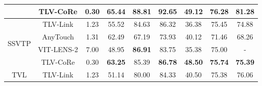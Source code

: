 \documentclass[letterpaper]{article} %
\theoremstyle{definition}                %
\theoremstyle{plain}                     %
\theoremstyle{remark}                    %
\begin{document}
\begin{table}[ht!]
\begin{tabular}{@{}c|c|c|ccc|c|c|
c@{}}
                               & TLV-CoRe   &     0.30        &      {\cellcolor[HTML]{F6E6E6}65.44}    &           {\cellcolor[HTML]{F6E6E6}\textbf{88.81}}   &   {\cellcolor[HTML]{F6E6E6}\textbf{92.65}}       &   {\cellcolor[HTML]{E2F0D9}\textbf{49.12}}                                &          {\cellcolor[HTML]{E2F0D9}\textbf{76.28}}        & \multicolumn{1}{c}{{\cellcolor[HTML]{E2F0D9}\textbf{81.28}}}                 \\ \midrule
\multirow{4}{*}{SSVTP}         & TLV-Link   &  1.23           &    {\cellcolor[HTML]{E2F0D9}55.52}      &        {\cellcolor[HTML]{E2F0D9}84.63}      &    {\cellcolor[HTML]{E2F0D9}86.32}      &      {\cellcolor[HTML]{E2F0D9}36.38}                             &         {\cellcolor[HTML]{E2F0D9}75.45}      & \multicolumn{1}{c}{{\cellcolor[HTML]{E2F0D9}74.88}}                    \\
                               & AnyTouch    & 1.31           &    {\cellcolor[HTML]{E2F0D9}62.49}      &     {\cellcolor[HTML]{E2F0D9}67.19}        &    {\cellcolor[HTML]{E2F0D9}73.93}       &          {\cellcolor[HTML]{E2F0D9}40.12}                         &  {\cellcolor[HTML]{E2F0D9}71.46}   & \multicolumn{1}{c}{{\cellcolor[HTML]{E2F0D9}68.26}}                              \\
                               & VIT-LENS-2   &  7.00         &     {\cellcolor[HTML]{E2F0D9}48.95}     &       {\cellcolor[HTML]{E2F0D9}\textbf{86.91}}       &    {\cellcolor[HTML]{E2F0D9}83.75}      &                         {\cellcolor[HTML]{E2F0D9}35.38}          &          {\cellcolor[HTML]{E2F0D9}75.00} & \multicolumn{1}{c}{{\cellcolor[HTML]{E2F0D9}-}}                         \\
                               & TLV-CoRe    &  0.30          &   {\cellcolor[HTML]{E2F0D9}\textbf{63.25}}       &    {\cellcolor[HTML]{E2F0D9}85.39}          &   {\cellcolor[HTML]{E2F0D9}\textbf{86.78}}       &     {\cellcolor[HTML]{E2F0D9}\textbf{48.50}}                              &    {\cellcolor[HTML]{E2F0D9}\textbf{75.74}}     & \multicolumn{1}{c}{{\cellcolor[HTML]{E2F0D9}\textbf{75.39}}}                          \\ \midrule
\multirow{4}{*}{TVL}           & TLV-Link    &  1.23         &   {\cellcolor[HTML]{E2F0D9}51.14}        &   {\cellcolor[HTML]{E2F0D9}80.00}            &     {\cellcolor[HTML]{E2F0D9}84.33}      &                  {\cellcolor[HTML]{E2F0D9}40.50}                 &     {\cellcolor[HTML]{E2F0D9}75.38}          & \multicolumn{1}{c}{{\cellcolor[HTML]{E2F0D9}76.06}}                   \\

\end{tabular}
\end{table}
\end{document}
